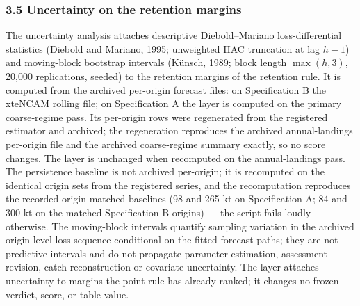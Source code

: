 \documentclass[11pt]{article}
\begin{document}
\subsubsection{3.5 Uncertainty on the retention
margins}\label{cod-uncertainty-on-the-retention-margins}

The uncertainty analysis attaches descriptive Diebold--Mariano loss-differential statistics
(Diebold and Mariano, 1995; unweighted HAC truncation at lag \(h-1\)) and
moving-block bootstrap intervals (K\"unsch, 1989; block length
\(\max(h,3)\), 20,000 replications, seeded) to the retention margins of
the retention rule. It is computed from the archived per-origin forecast
files: on Specification B the xteNCAM rolling file; on Specification A
the layer is computed on the primary coarse-regime pass. Its per-origin
rows were regenerated from the registered estimator and archived; the
regeneration reproduces the archived annual-landings per-origin file
and the archived coarse-regime summary exactly, so no score changes.
The layer is unchanged when recomputed on the annual-landings pass.
The persistence baseline is not archived per-origin; it is recomputed on the
identical origin sets from the registered series, and the recomputation
reproduces the recorded origin-matched baselines (98 and 265 kt on
Specification A; 84 and 300 kt on the matched Specification B origins)
--- the script fails loudly otherwise. The moving-block intervals quantify sampling variation in the archived
origin-level loss sequence conditional on the fitted forecast paths; they
are not predictive intervals and do not propagate parameter-estimation,
assessment-revision, catch-reconstruction or covariate uncertainty. The
layer attaches uncertainty to margins the point rule has already
ranked; it changes no frozen verdict,
score, or table value.
\end{document}
